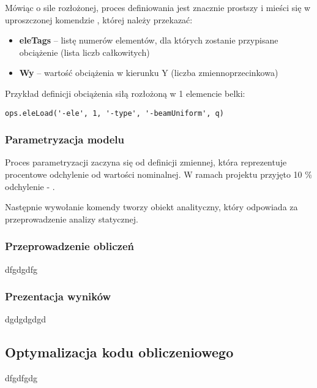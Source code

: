 Mówiąc o sile rozłożonej, proces definiowania jest znacznie prostszy i mieści się w uproszczonej komendzie
, której należy przekazać:

\begin{itemize}
    \item \textbf{eleTags} – listę numerów elementów, dla których zostanie przypisane obciążenie (lista liczb całkowitych)
    \item \textbf{Wy} – wartość obciążenia w kierunku Y (liczba zmiennoprzecinkowa)
\end{itemize}

Przykład definicji obciążenia siłą rozłożoną w 1 elemencie belki:
\begin{lstlisting}
ops.eleLoad('-ele', 1, '-type', '-beamUniform', q)
\end{lstlisting}

\subsubsection{Parametryzacja modelu}

Proces parametryzacji zaczyna się od definicji zmiennej, która reprezentuje procentowe odchylenie od wartości nominalnej.
W ramach projektu przyjęto 10 \% odchylenie - .

Następnie wywołanie komendy  tworzy obiekt analityczny, który odpowiada za przeprowadzenie analizy statycznej.

\subsubsection{Przeprowadzenie obliczeń}

dfgdgdfg

\subsubsection{Prezentacja wyników}

dgdgdgdgd

\subsection{Optymalizacja kodu obliczeniowego}

dfgdfgdg
